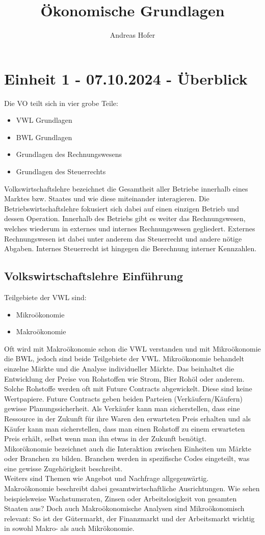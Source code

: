 \documentclass{article}
\title{\vspace{-3cm}Ökonomische Grundlagen}
\author{Andreas Hofer}
\begin{document}
	\maketitle
	\section{Einheit 1 - 07.10.2024 - Überblick}
	Die VO teilt sich in vier grobe Teile:
	\begin{itemize}
		\item{VWL Grundlagen}
		\item{BWL Grundlagen}
		\item{Grundlagen des Rechnungswesens}
		\item{Grundlagen des Steuerrechts}
	\end{itemize}
	Volkswirtschaftslehre bezeichnet die Gesamtheit aller Betriebe innerhalb eines Marktes bzw. Staates und wie diese miteinander interagieren. Die Betriebswirtschaftslehre fokusiert sich dabei auf einen einzigen Betrieb und dessen Operation. Innerhalb des Betriebs gibt es weiter das Rechnungswesen, welches wiederum in externes und internes Rechnungswesen gegliedert. Externes Rechnungswesen ist dabei unter anderem das Steuerrecht und andere nötige Abgaben. Internes Steuerrecht ist hingegen die Berechnung interner Kennzahlen. \\
	\subsection{Volkswirtschaftslehre Einführung}
	Teilgebiete der VWL sind:
	\begin{itemize}
		\item{Mikroökonomie}
		\item{Makroökonomie}
	\end{itemize}
	Oft wird mit Makroökonomie schon die VWL verstanden und mit Mikroökonomie die BWL, jedoch sind beide Teilgebiete der VWL. Mikroökonomie behandelt einzelne Märkte und die Analyse individueller Märkte. Das beinhaltet die Entwicklung der Preise von Rohstoffen wie Strom, Bier Rohöl oder anderem. Solche Rohstoffe werden oft mit Future Contracts abgewickelt. Diese sind keine Wertpapiere. Future Contracts geben beiden Parteien (Verkäufern/Käufern) gewisse Planungssicherheit. Als Verkäufer kann man sicherstellen, dass eine Ressource in der Zukunft für ihre Waren den erwarteten Preis erhalten und als Käufer kann man sicherstellen, dass man einen Rohstoff zu einem erwarteten Preis erhält, selbst wenn man ihn etwas in der Zukunft benötigt. \\
	Mikorökonomie bezeichnet auch die Interaktion zwischen Einheiten um Märkte oder Branchen zu bilden. Branchen werden in spezifische Codes eingeteilt, was eine gewisse Zugehörigkeit beschreibt. \\
	Weiters sind Themen wie Angebot und Nachfrage allgegenwärtig. \\
	Makroökonomie beschreibt dabei gesamtwirtschaftliche Ausrichtungen. Wie sehen beispielsweise Wachstumsraten, Zinsen oder Arbeitslosigkeit von gesamten Staaten aus? Doch auch Makroökonomische Analysen sind Mikroökonomisch relevant: So ist der Gütermarkt, der Finanzmarkt und der Arbeitsmarkt wichtig in sowohl Makro- als auch Mikrökonomie. \\
\end{document}
